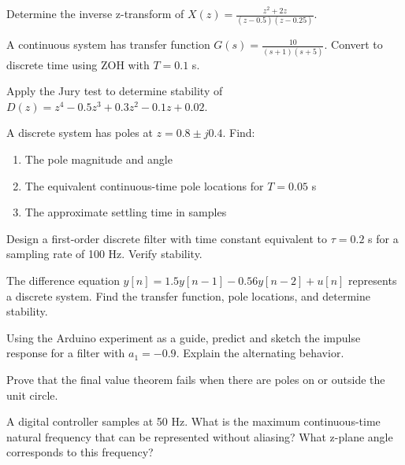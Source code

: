 \begin{exercise}
Determine the inverse z-transform of $X(z) = \frac{z^2 + 2z}{(z-0.5)(z-0.25)}$.
\end{exercise}

\begin{exercise}
A continuous system has transfer function $G(s) = \frac{10}{(s+1)(s+5)}$. Convert to discrete time using ZOH with $T = 0.1$ s.
\end{exercise}

\begin{exercise}
Apply the Jury test to determine stability of $D(z) = z^4 - 0.5z^3 + 0.3z^2 - 0.1z + 0.02$.
\end{exercise}

\begin{exercise}
A discrete system has poles at $z = 0.8 \pm j0.4$. Find:
\begin{enumerate}
    \item The pole magnitude and angle
    \item The equivalent continuous-time pole locations for $T = 0.05$ s
    \item The approximate settling time in samples
\end{enumerate}
\end{exercise}

\begin{exercise}
Design a first-order discrete filter with time constant equivalent to $\tau = 0.2$ s for a sampling rate of 100 Hz. Verify stability.
\end{exercise}

\begin{exercise}
The difference equation $y[n] = 1.5y[n-1] - 0.56y[n-2] + u[n]$ represents a discrete system. Find the transfer function, pole locations, and determine stability.
\end{exercise}

\begin{exercise}
Using the Arduino experiment as a guide, predict and sketch the impulse response for a filter with $a_1 = -0.9$. Explain the alternating behavior.
\end{exercise}

\begin{exercise}
Prove that the final value theorem fails when there are poles on or outside the unit circle.
\end{exercise}

\begin{exercise}
A digital controller samples at 50 Hz. What is the maximum continuous-time natural frequency that can be represented without aliasing? What z-plane angle corresponds to this frequency?
\end{exercise}

